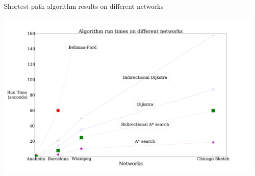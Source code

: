 \documentclass{beamer}
\begin{document}

\begin{frame}{Shortest path algorithm results on different networks}
    \begin{center}
    \includegraphics[width=\textwidth, keepaspectratio]{img/runtime2}
    \end{center}

\end{frame}
\end{document}
